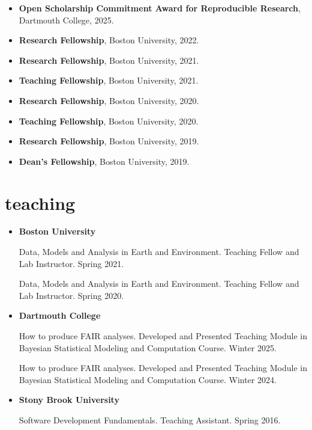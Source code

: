 \documentclass[10pt,oneside]{article}
\begin{document}
\begin{itemize}[label={}]
  
  \item \textbf{Open Scholarship Commitment Award for Reproducible Research}, Dartmouth College, 2025.
        
  \item \textbf{Research Fellowship}, Boston University, 2022.
        
  \item \textbf{Research Fellowship}, Boston University, 2021.
        
  \item \textbf{Teaching Fellowship}, Boston University, 2021.
        
  \item \textbf{Research Fellowship}, Boston University, 2020.
        
  \item \textbf{Teaching Fellowship}, Boston University, 2020.
        
  \item \textbf{Research Fellowship}, Boston University, 2019.
        
  \item \textbf{Dean's Fellowship}, Boston University, 2019.
        
\end{itemize}


\section{teaching}

\mbox{}\vspace{-\dimexpr\baselineskip\relax}


\begin{itemize}[label={}]
  
  \item \textbf{Boston University}
        
        Data, Models and Analysis in Earth and Environment. Teaching Fellow and Lab Instructor. Spring 2021.
        
        Data, Models and Analysis in Earth and Environment. Teaching Fellow and Lab Instructor. Spring 2020.
        
        
  \item \textbf{Dartmouth College}
        
        How to produce FAIR analyses. Developed and Presented Teaching Module in Bayesian Statistical Modeling and Computation Course. Winter 2025.
        
        How to produce FAIR analyses. Developed and Presented Teaching Module in Bayesian Statistical Modeling and Computation Course. Winter 2024.
        
        
  \item \textbf{Stony Brook University}
        
        Software Development Fundamentals. Teaching Assistant. Spring 2016.
        
        
\end{itemize}
\end{document}

